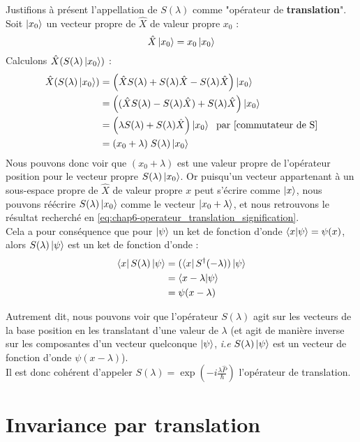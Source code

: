 \documentclass[../notesdecours]{subfiles}
\begin{document}
Justifions à présent l'appellation de $S(\lambda)$ comme "opérateur de \textbf{translation}". Soit $\ket{x_0}$ un vecteur propre de $\hat{X}$ de valeur propre $x_0$ : $$ \hat{X} \ket{x_0} = x_0 \ket{x_0} $$
Calculons $\hat{X} (S(\lambda) \ket{x_0})$ : 
\begin{align}
    \hat{X} (S(\lambda) \ket{x_0}) &= \left( \hat{X}S(\lambda) + S(\lambda) \hat{X} - S(\lambda)\hat{X} \right) \ket{x_0} \notag \\
    &= \left( (\hat{X}S(\lambda) - S(\lambda)\hat{X}) + S(\lambda)\hat{X} \right) \ket{x_0} \notag \\
    &= \left( \lambda S(\lambda) + S(\lambda) \hat{X} \right) \ket{x_0} \; \mbox{ par \eqref{commutateur de S}} \notag \\
    &= (x_0 + \lambda) \; S(\lambda) \ket{x_0}
\end{align}
Nous pouvons donc voir que $(x_0 + \lambda)$ est une valeur propre de l'opérateur position pour le vecteur propre $S(\lambda) \ket{x_0}$. Or puisqu'un vecteur appartenant à un sous-espace propre de $\hat{X}$ de valeur propre $x$ peut s'écrire comme $\ket{x}$, nous pouvons réécrire $S(\lambda) \ket{x_0}$ comme le vecteur $\ket{x_0 + \lambda}$, et nous retrouvons le résultat recherché en \eqref{eq:chap6-operateur_translation_signification}. \\

Cela a pour conséquence que pour $\ket{\psi}$ un ket de fonction d'onde $\braket{x|\psi} = \psi(x)$, alors $S(\lambda) \ket{\psi}$ est un ket de fonction d'onde : 
\begin{align}
    \bra{x}S(\lambda) \ket{\psi} &= (\bra{x}S^\dagger (-\lambda)) \ket{\psi} \notag \\
    &= \braket{x-\lambda | \psi} \notag \\
    &= \psi(x-\lambda) 
\end{align}

Autrement dit, nous pouvons voir que l'opérateur $S(\lambda)$ agit sur les vecteurs de la base position en les translatant d'une valeur de $\lambda$ (et agit de manière inverse sur les composantes d'un vecteur quelconque $\ket{\psi}$, \textit{i.e} $S(\lambda)\ket{\psi}$ est un vecteur de fonction d'onde $\psi(x-\lambda)$). \\
Il est donc cohérent d'appeler $S(\lambda) = \exp \left( -i \frac{\lambda \hat{P}}{\hbar} \right)$ l'opérateur de translation. 



\section{Invariance par translation}
\end{document}
